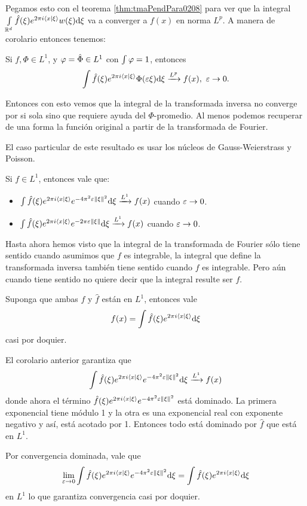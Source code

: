\documentclass[12pt]{memoir}
\begin{document}
Pegamos esto con el teorema \ref{thm:tmaPendPara0208} para ver que la integral $\int\limits_{\mathbb{R}^d}\hat{f}(\xi)e^{2\pi i\braket{x}{\xi}}w(\xi)\dd\xi$ va a converger a $f(x)$ en norma $L^p$. A manera de corolario entonces tenemos:

\begin{Cor}\label{cor:convLpFTxPhiMean}
Si $f,\Phi\in L^1$, y $\varphi=\hat\Phi\in L^1$ con $\int\varphi=1$, entonces
$$\int\hat{f}(\xi)e^{2\pi i\braket{x}{\xi}}\Phi(\varepsilon\xi)\dd\xi\xrightarrow[]{L^p}f(x),\ \varepsilon\to 0.$$
\end{Cor}

Entonces con esto vemos que la integral de la transformada inversa no converge por si sola sino que requiere ayuda del $\Phi$-promedio. Al menos podemos recuperar de una forma la función original a partir de la transformada de Fourier.\par 
El caso particular de este resultado es usar los núcleos de Gauss-Weierstrass y Poisson.

\begin{Cor}
  Si $f\in L^1$, entonces vale que:
  \begin{itemize}
    \item $\int\hat{f}(\xi)e^{2\pi i\braket{x}{\xi}}e^{-4\pi^2\varepsilon\left\|\xi\right\|^2}\dd\xi\xrightarrow[]{L^1}f(x)$ cuando $\varepsilon\to 0$.
    \item $\int\hat{f}(\xi)e^{2\pi i\braket{x}{\xi}}e^{-2\pi\varepsilon\left\|\xi\right\|}\dd\xi\xrightarrow[]{L^1}f(x)$ cuando $\varepsilon\to 0$.
  \end{itemize}
\end{Cor}

Hasta ahora hemos visto que la integral de la transformada de Fourier sólo tiene sentido cuando asumimos que $f$ es integrable, la integral que define la transformada inversa también tiene sentido cuando $f$ es integrable. Pero aún cuando tiene sentido no quiere decir que la integral resulte ser $f$. 

\begin{Cor}
  Suponga que ambas $f$ y $\hat{f}$ están en $L^1$, entonces vale
  $$f(x)=\int\hat{f}(\xi)e^{2\pi i\braket{x}{\xi}}\dd\xi$$ %
  casi por doquier.
\end{Cor}

\begin{ptcbp}
  El corolario anterior garantiza que 
  $$\int\hat{f}(\xi)e^{2\pi i\braket{x}{\xi}}e^{-4\pi^2\varepsilon\left\|\xi\right\|^2}\dd\xi\xrightarrow[]{L^1}f(x)$$
  donde ahora el término $\hat{f}(\xi)e^{2\pi i\braket{x}{\xi}}e^{-4\pi^2\varepsilon\left\|\xi\right\|^2}$ está dominado. La primera exponencial tiene módulo 1 y la otra es una exponencial real con exponente negativo y así, está acotado por 1. Entonces todo está dominado por $\hat{f}$ que está en $L^1$.\par 
  Por convergencia dominada, vale que 
  $$\lim_{\varepsilon\to0}\int\hat{f}(\xi)e^{2\pi i\braket{x}{\xi}}e^{-4\pi^2\varepsilon\left\|\xi\right\|^2}\dd\xi=\int\hat{f}(\xi)e^{2\pi i\braket{x}{\xi}}\dd\xi$$
  en $L^1$ lo que garantiza convergencia casi por doquier.
\end{ptcbp}
\end{document}
